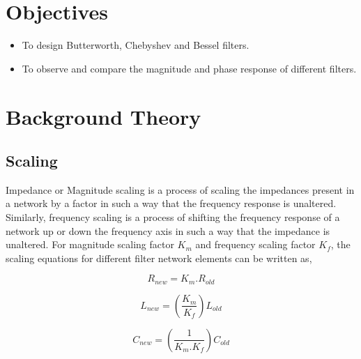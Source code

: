 \documentclass{lab_sheet}
\begin{document}
    \clearpage
    \tableofcontents
    \clearpage
    \listoffigures
    \clearpage
    \listoftables
    \clearpage
    \section{Objectives}
    \begin{itemize}
        \item To design Butterworth, Chebyshev and Bessel filters.
        \item To observe and compare the magnitude and phase response of different filters.
    \end{itemize}

    \section{Background Theory}
    
    \subsection{Scaling}
    Impedance or Magnitude scaling is a process of scaling the impedances present in a network by a factor in such a way that the frequency response is unaltered. Similarly, frequency scaling is a process of shifting the frequency response of a network up or down the frequency axis in such a way that the impedance is unaltered. For magnitude scaling factor $K_m$ and frequency scaling factor $K_f$, the scaling equations for different filter network elements can be written as,

    \begin{equation}
        R_{new}=K_m.R_{old}
        \label{eqn:r_mag_freq}
     \end{equation}
     
     \begin{equation}
        L_{new}=\left(\frac{K_m}{K_f}\right)L_{old}
        \label{eqn:l_mag_freq}
     \end{equation}
     
     \begin{equation}
        C_{new}=\left(\frac{1}{K_m.K_f}\right)C_{old}
        \label{eqn:c_mag_freq}
     \end{equation}
\end{document}
